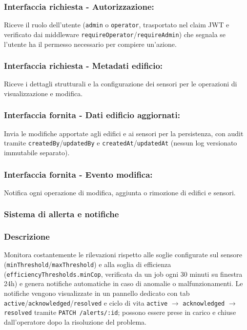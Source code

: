        \subsubsection*{Interfaccia richiesta - Autorizzazione:}
            Riceve il ruolo dell'utente (\texttt{admin} o \texttt{operator}, trasportato nel claim JWT e verificato dai middleware \texttt{requireOperator}/\texttt{requireAdmin}) che segnala se l'utente ha il permesso necessario per compiere un'azione.
        \subsubsection*{Interfaccia richiesta - Metadati edificio:}
            Riceve i dettagli strutturali e la configurazione dei sensori per le operazioni di visualizzazione e modifica.
        \subsubsection*{Interfaccia fornita - Dati edificio aggiornati:}
            Invia le modifiche apportate agli edifici e ai sensori per la persistenza, con audit tramite \texttt{createdBy}/\texttt{updatedBy} e \texttt{createdAt}/\texttt{updatedAt} (nessun log versionato immutabile separato).
        \subsubsection*{Interfaccia fornita - Evento modifica:}
            Notifica ogni operazione di modifica, aggiunta o rimozione di edifici e sensori.

    \subsubsection{Sistema di allerta e notifiche}
        \subsubsection*{Descrizione}
            Monitora costantemente le rilevazioni rispetto alle soglie configurate sul sensore (\texttt{minThreshold}/\texttt{maxThreshold}) e alla soglia di efficienza (\texttt{efficiencyThresholds.minCop}, verificata da un job ogni 30 minuti su finestra 24h) e genera notifiche automatiche in caso di anomalie o malfunzionamenti. Le notifiche vengono visualizzate in un pannello dedicato con tab \texttt{active}/\texttt{acknowledged}/\texttt{resolved} e ciclo di vita \texttt{active} $\rightarrow$ \texttt{acknowledged} $\rightarrow$ \texttt{resolved} tramite \texttt{PATCH /alerts/:id}; possono essere prese in carico e chiuse dall'operatore dopo la risoluzione del problema.
